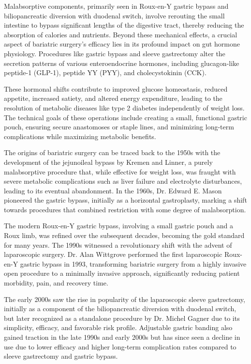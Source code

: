 Malabsorptive components, primarily seen in Roux-en-Y gastric bypass and biliopancreatic diversion with duodenal switch, involve rerouting the small intestine to bypass significant lengths of the digestive tract, thereby reducing the absorption of calories and nutrients. Beyond these mechanical effects, a crucial aspect of bariatric surgery's efficacy lies in its profound impact on gut hormone physiology. Procedures like gastric bypass and sleeve gastrectomy alter the secretion patterns of various enteroendocrine hormones, including glucagon-like peptide-1 (GLP-1), peptide YY (PYY), and cholecystokinin (CCK). 

These hormonal shifts contribute to improved glucose homeostasis, reduced appetite, increased satiety, and altered energy expenditure, leading to the resolution of metabolic diseases like type 2 diabetes independently of weight loss. The technical goals of these operations include creating a small, functional gastric pouch, ensuring secure anastomoses or staple lines, and minimizing long-term complications while maximizing metabolic benefits.

The origins of bariatric surgery can be traced back to the 1950s with the development of the jejunoileal bypass by Kremen and Linner, a purely malabsorptive procedure that, while effective for weight loss, was fraught with severe metabolic complications such as liver failure and electrolyte disturbances, leading to its eventual abandonment. In the 1960s, Dr. Edward E. Mason pioneered the gastric bypass, initially as a horizontal gastroplasty, marking a shift towards procedures that combined restriction with some degree of malabsorption. 

The modern Roux-en-Y gastric bypass, involving a small gastric pouch and a Roux limb, was refined over the subsequent decades, becoming the gold standard for many years. The 1990s witnessed a revolutionary shift with the advent of laparoscopic surgery. Dr. Alan Wittgrove performed the first laparoscopic Roux-en-Y gastric bypass in 1993, transforming bariatric surgery from a highly invasive open procedure to a minimally invasive approach, significantly reducing patient morbidity, pain, and recovery time. 

The early 2000s saw the rise in popularity of the laparoscopic sleeve gastrectomy, initially as a component of the biliopancreatic diversion with duodenal switch, but later recognized as a standalone procedure by Dr. Michel Gagner due to its simplicity, efficacy, and favorable risk profile. Adjustable gastric banding also gained traction in the late 1990s and early 2000s but has since seen a decline in use due to lower efficacy and higher long-term complication rates compared to sleeve gastrectomy and gastric bypass.

